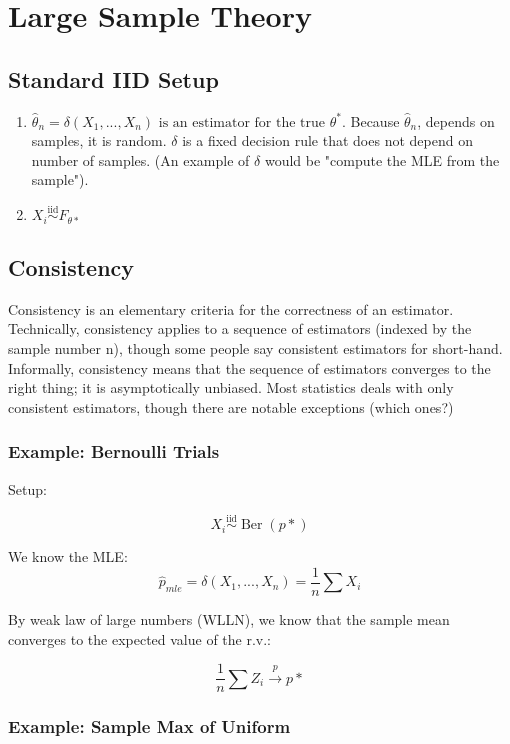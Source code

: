 \documentclass[aos,preprint]{imsart}
\numberwithin{equation}{section}
\theoremstyle{plain}
\DeclareMathOperator{\Ber}{Ber}
\begin{document}
\section{Large Sample Theory}

\subsection{Standard IID Setup}
\begin{enumerate}
\item $ \hat \theta_n = \delta(X_1, ... , X_n) \text{ is an estimator for the true } \theta^* $.  Because $\hat \theta_n$, depends on samples, it is random. $\delta $  is a fixed decision rule that does not depend on number of samples. (An example of $ \delta $ would be "compute the MLE from the sample").
\item $ X_i \overset{\text{iid}}{\sim} F_{\theta*} $
\end{enumerate}

\subsection{Consistency}

Consistency is an elementary criteria for the correctness of an estimator. Technically, consistency applies to a sequence of estimators (indexed by the sample number n), though some people say consistent estimators for short-hand. Informally, consistency means that the sequence of estimators converges to the right thing; it is asymptotically unbiased. Most statistics deals with only consistent estimators, though there are notable exceptions (which ones?)

\subsubsection{Example: Bernoulli Trials}

Setup: 

$$ X_i \overset{\text{iid}}{\sim} \Ber(p*) $$

We know the MLE: 
$$ \hat p_{mle} = \delta(X_1,..., X_n) = \frac{1}{n} \sum X_i $$

By weak law of large numbers (WLLN), we know that the sample mean converges to the expected value of the r.v.: 

$$ \frac{1}{n}  \sum Z_i \xrightarrow{p} p* $$

\subsubsection{Example: Sample Max of Uniform}
\end{document}
